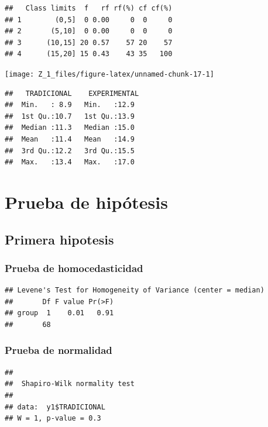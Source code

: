\documentclass[12pt,]{report}
\begin{document}
\begin{verbatim}
##   Class limits  f   rf rf(%) cf cf(%)
## 1        (0,5]  0 0.00     0  0     0
## 2       (5,10]  0 0.00     0  0     0
## 3      (10,15] 20 0.57    57 20    57
## 4      (15,20] 15 0.43    43 35   100
\end{verbatim}

\begin{center}\texttt{[image: Z\_1\_files/figure-latex/unnamed-chunk-17-1]} \end{center}

\begin{verbatim}
##   TRADICIONAL    EXPERIMENTAL 
##  Min.   : 8.9   Min.   :12.9  
##  1st Qu.:10.7   1st Qu.:13.9  
##  Median :11.3   Median :15.0  
##  Mean   :11.4   Mean   :14.9  
##  3rd Qu.:12.2   3rd Qu.:15.5  
##  Max.   :13.4   Max.   :17.0
\end{verbatim}

\hypertarget{prueba-de-hipuxf3tesis-surhone2010shapiro}{%
\section{\texorpdfstring{Prueba de hipótesis \citep{surhone2010shapiro}}{Prueba de hipótesis {[}@surhone2010shapiro{]}}}\label{prueba-de-hipuxf3tesis-surhone2010shapiro}}

\hypertarget{primera-hipotesis}{%
\subsection{Primera hipotesis}\label{primera-hipotesis}}

\hypertarget{prueba-de-homocedasticidad}{%
\subsubsection{Prueba de homocedasticidad}\label{prueba-de-homocedasticidad}}

\begin{verbatim}
## Levene's Test for Homogeneity of Variance (center = median)
##       Df F value Pr(>F)
## group  1    0.01   0.91
##       68
\end{verbatim}

\hypertarget{prueba-de-normalidad}{%
\subsubsection{Prueba de normalidad}\label{prueba-de-normalidad}}

\begin{verbatim}
## 
##  Shapiro-Wilk normality test
## 
## data:  y1$TRADICIONAL
## W = 1, p-value = 0.3
\end{verbatim}
\end{document}
